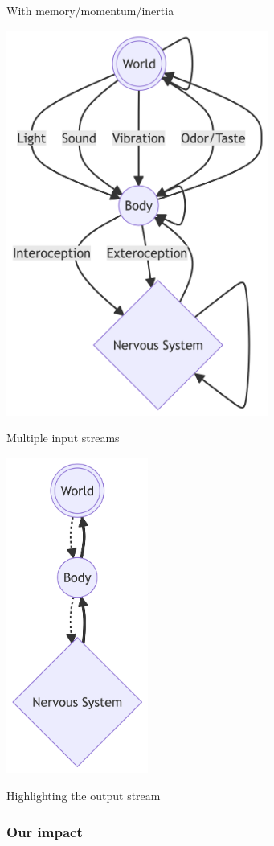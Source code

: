 \documentclass[
  letterpaper,
  DIV=11,
  numbers=noendperiod]{scrartcl}
\begin{document}
With memory/momentum/inertia

\includegraphics[width=3.39in,height=4.99in]{action_files/figure-latex/mermaid-figure-4.png}

Multiple input streams

\includegraphics[width=1.84in,height=4.09in]{action_files/figure-latex/mermaid-figure-3.png}

Highlighting the output stream

\subsubsection{Our impact}\label{our-impact}
\end{document}
